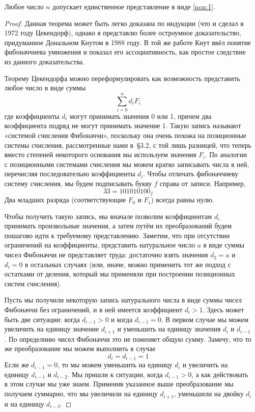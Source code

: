 \begin{thm}
Любое число $n$ допускает единственное представление в виде \eqref{non:1}.
\end{thm}
\begin{proof}
Данная теорема может быть легко доказана по индукции (что и сделал в 1972 году Цекендорф), однако я представлю более остроумное доказательство, придуманное Дональном Кнутом в 1988 году. В той же работе Кнут ввёл понятие фибоначчиева умножения и показал его ассоциативность, как простое следствие из данного доказательства.

Теорему Цекендорфа можно переформулировать как возможность представить любое число в виде суммы
$$\sum_{i=0}^n d_iF_i$$
где коэффициенты $d_i$ могут принимать значения 0 или 1, причем два коэффициента подряд не могут принимать значение 1. Такую запись называют «системой счисления Фибоначчи», поскольку она очень похожа на позиционные системы счисления, рассмотренные нами в~\S3.2, с той лишь разницей, что теперь вместо степеней некоторого основания мы используем значения $F_i$. По аналогии с позиционными системами счисления мы можем кратко записывать числа в ней, перечисляя последовательно коэффициенты $d_i$. Чтобы отличать фибоначчиеву систему счисления, мы будем подписывать букву $f$ справа от записи. Например,
$$33 = 101010100_f$$
Два младших разряда (соответствующие $F_0$ и $F_1$) всегда равны нулю.

Чтобы получить такую запись, мы вначале позволим коэффициентам $d_i$ принимать произвольные значения, а затем путём их преобразований будем пошагово идти к требуемому представлению. Заметим, что при отсутствии ограничений на коэффициенты, представить натуральное число $a$ в виде суммы чисел Фибоначчи не представляет труда: достаточно взять значения $d_2 = a$ и $d_i = 0$ в остальных случаях (или, иначе, можно применить тот же подход с остатками от деления, который мы применяли при построении позиционных систем счисления).

Пусть мы получили некоторую запись натурального числа в виде суммы чисел Фибоначчи без ограничений, и в ней имеется коэффициент $d_i > 1$. Здесь может быть две ситуации: когда $d_{i-1}> 0$ и когда $d_{i-1} = 0$. В первом случае мы можем увеличить на единицу значение $d_{i+1}$ и уменьшить на единицу значения $d_i$ и $d_{i-1}$. По определнию чисел Фибоначчи это не поменяет общую сумму. Замечу, что то же преобразование мы можем выполнить в случае
$$d_i = d_{i-1} = 1$$
Если же $d_{i-1} = 0$, то мы можем уменьшить на единицу $d_i$ и увеличить на единицу $d_{i-1}$ и $d_{i-2}$. Мы пришли к ситуации, когда $d_{i-1} > 0$, а как действовать в этом случае мы уже знаем. Применив указанное выше преобразование мы получаем суммарно, что мы увеличили на единицу $d_{i+1}$, уменьшили на двойку $d_i$ и на единицу $d_{i-2}$.


\end{proof}

